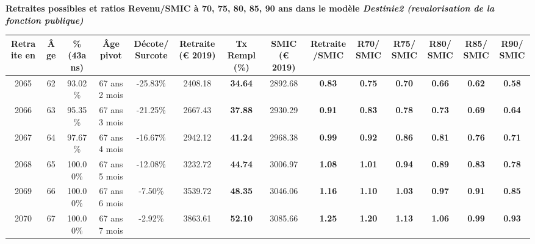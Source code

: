  \vspace{0.1cm} 
{\bf \noindent Retraites possibles et ratios Revenu/SMIC à 70, 75, 80, 85, 90 ans dans le modèle \emph{Destinie2 (revalorisation de la fonction publique)}}  
 
\begin{adjustbox}{max width=\textwidth} 
\begin{tabular}[htb]{|c|c||c|c|c||c|c||c|c||c|c|c|c|c|} 
\hline 
 Retraite en &  Âge &  \%(43ans) &  Âge pivot &  Décote/Surcote &  Retraite (\euro{} 2019) &  Tx Rempl(\%) &  SMIC (\euro{} 2019) &  Retraite/SMIC &  R70/SMIC &  R75/SMIC &  R80/SMIC &  R85/SMIC &  R90/SMIC \\ 
\hline \hline 
 2065 &  62 &  93.02\% &  67 ans 2 mois &  -25.83\% &  2408.18 &  {\bf 34.64} &  2892.68 &  {\bf {\color{red} 0.83}} &  {\bf {\color{red} 0.75}} &  {\bf {\color{red} 0.70}} &  {\bf {\color{red} 0.66}} &  {\bf {\color{red} 0.62}} &  {\bf {\color{red} 0.58}} \\ 
\hline 
 2066 &  63 &  95.35\% &  67 ans 3 mois &  -21.25\% &  2667.43 &  {\bf 37.88} &  2930.29 &  {\bf {\color{red} 0.91}} &  {\bf {\color{red} 0.83}} &  {\bf {\color{red} 0.78}} &  {\bf {\color{red} 0.73}} &  {\bf {\color{red} 0.69}} &  {\bf {\color{red} 0.64}} \\ 
\hline 
 2067 &  64 &  97.67\% &  67 ans 4 mois &  -16.67\% &  2942.12 &  {\bf 41.24} &  2968.38 &  {\bf {\color{red} 0.99}} &  {\bf {\color{red} 0.92}} &  {\bf {\color{red} 0.86}} &  {\bf {\color{red} 0.81}} &  {\bf {\color{red} 0.76}} &  {\bf {\color{red} 0.71}} \\ 
\hline 
 2068 &  65 &  100.00\% &  67 ans 5 mois &  -12.08\% &  3232.72 &  {\bf 44.74} &  3006.97 &  {\bf 1.08} &  {\bf 1.01} &  {\bf {\color{red} 0.94}} &  {\bf {\color{red} 0.89}} &  {\bf {\color{red} 0.83}} &  {\bf {\color{red} 0.78}} \\ 
\hline 
 2069 &  66 &  100.00\% &  67 ans 6 mois &  -7.50\% &  3539.72 &  {\bf 48.35} &  3046.06 &  {\bf 1.16} &  {\bf 1.10} &  {\bf 1.03} &  {\bf {\color{red} 0.97}} &  {\bf {\color{red} 0.91}} &  {\bf {\color{red} 0.85}} \\ 
\hline 
 2070 &  67 &  100.00\% &  67 ans 7 mois &  -2.92\% &  3863.61 &  {\bf 52.10} &  3085.66 &  {\bf 1.25} &  {\bf 1.20} &  {\bf 1.13} &  {\bf 1.06} &  {\bf {\color{red} 0.99}} &  {\bf {\color{red} 0.93}} \\ 
\hline 
\hline 
\end{tabular} 
\end{adjustbox} 
 
